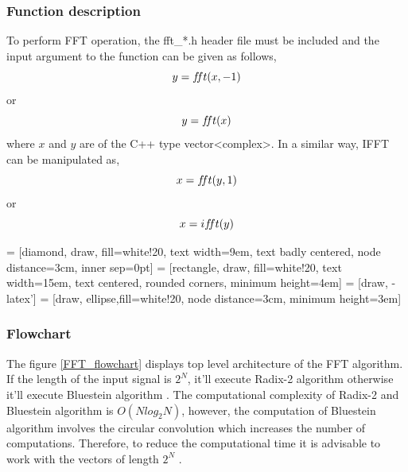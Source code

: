 \subsubsection{Function description}
To perform FFT operation, the fft\_*.h header file must be included and the input argument to the function can be given as follows,
\begin{equation*}
y=f\hspace{-0.85mm}ft(x,-1)
\end{equation*}
or
\begin{equation*}
	y = f\hspace{-0.85mm}ft(x)
\end{equation*}
where $x$ and $y$ are of the C++ type vector<complex>. In a similar way, IFFT can be manipulated as,
\begin{equation*}
x = f\hspace{-0.85mm}ft(y,1)
\end{equation*}
or
\begin{equation*}
	x = if\hspace{-0.85mm}ft(y)
\end{equation*}

\newpage
 = [diamond, draw, fill=white!20,
text width=9em, text badly centered, node distance=3cm, inner sep=0pt]
 = [rectangle, draw, fill=white!20,
text width=15em, text centered, rounded corners, minimum height=4em]
 = [draw, -latex']
 = [draw, ellipse,fill=white!20, node distance=3cm,
minimum height=3em]

\subsubsection{Flowchart}
The figure \ref{FFT_flowchart} displays top level architecture of the FFT algorithm.  If the length of the input signal is $2^N$, it'll execute Radix-2 algorithm otherwise it'll execute Bluestein algorithm \cite{Rao2010a}. The computational complexity of Radix-2 and Bluestein algorithm is $O(Nlog_{2}N)$, however, the computation of Bluestein algorithm involves the circular convolution which increases the number of computations. Therefore, to reduce the computational time it is advisable to work with the vectors of length $2^N$ \cite{Chu2000}.


